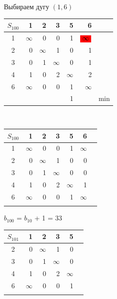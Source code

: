 \documentclass[12pt]{article}
\begin{document}
Выбираем дугу $(1,6)$

\begin{flushleft}
\begin{tabular}{c||rrrrr||c}
$S_{100}$ & 1 & 2 & 3 & 5 & 6 & \\
\hline
\hline
1 & $\infty$ & 0 & 0  & 1 & $\colorbox{red}{$\infty$}$ & \\
2 & 0 & $\infty$ & 1  & 0 & 1 & \\
3 & 0 & 1 & $\infty$  & 0 & 1 & \\
4 & 1 & 0 & 2  & $\infty$ & 2 & \\
6 & $\infty$ & 0 & 0  & 1 & $\infty$ & \\
\hline
\hline
 &  &   &    & 1 &  & min \\
\end{tabular}
$\qquad $ 
\begin{tabular}{c||rrrrr||c}
$S_{100}$ & 1 & 2 & 3 & 5 & 6 & \\
\hline
\hline
1 & $\infty$ & 0 & 0  & 1 & $\infty$ & \\
2 & 0 & $\infty$ & 1  & 0 & 0 & \\
3 & 0 & 1 & $\infty$  & 0 & 0 & \\
4 & 1 & 0 & 2  & $\infty$ & 1 & \\
6 & $\infty$ & 0 & 0  & 1 & $\infty$ & \\
\hline
\hline
 &  &  &  &  &  & \\
\end{tabular}
\end{flushleft}

$b_{100}$ = $b_{10}$ + 1 = 33\\

\begin{flushleft}
\begin{tabular}{c||rrrr||c}
$S_{101}$ & 1 & 2 & 3 & 5 &  \\
\hline
\hline
2 & 0 & $\infty$ & 1  & 0 &  \\
3 & 0 & 1 & $\infty$  & 0 &  \\
4 & 1 & 0 & 2  & $\infty$ &  \\
6 & $\infty$ & 0 & 0  & 1 &  \\
\hline
\hline
 &  &  &  &  &   \\
\end{tabular}
\end{flushleft}
\end{document}

